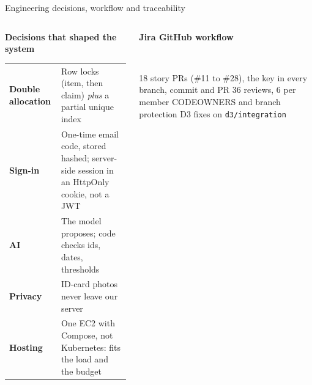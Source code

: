 \documentclass[aspectratio=169,10pt]{beamer}
\newcommand{\head}[1]{{\footnotesize\bfseries\color{branddark}#1}\par\vspace{1pt}}
\begin{document}
\begin{frame}[t]{Engineering decisions, workflow and traceability}
\begin{columns}[T,onlytextwidth]
\begin{column}{0.42\textwidth}
\head{Decisions that shaped the system}
\scriptsize
\renewcommand{\arraystretch}{1.3}
\begin{tabular}{@{}L{1.55cm}L{4.1cm}@{}}
\toprule
\textbf{Double allocation} & Row locks (item, then claim) \emph{plus} a partial unique index \\
\textbf{Sign-in} & One-time email code, stored hashed; server-side session in an HttpOnly cookie, not a JWT \\
\textbf{AI} & The model proposes; code checks ids, dates, thresholds \\
\textbf{Privacy} & ID-card photos never leave our server \\
\textbf{Hosting} & One EC2 with Compose, not Kubernetes: fits the load and the budget \\
\bottomrule
\end{tabular}
\end{column}
\begin{column}{0.54\textwidth}
\head{Jira \textrightarrow{} GitHub workflow}
\\[2pt]
{\scriptsize 18 story PRs (\#11 to \#28), the key in every branch, commit and PR \textperiodcentered{} 36 reviews, 6 per member \textperiodcentered{} CODEOWNERS and branch protection \textperiodcentered{} D3 fixes on \texttt{d3/integration}\par}
\vspace{6pt}


\end{column}
\end{columns}
\end{frame}
\end{document}
